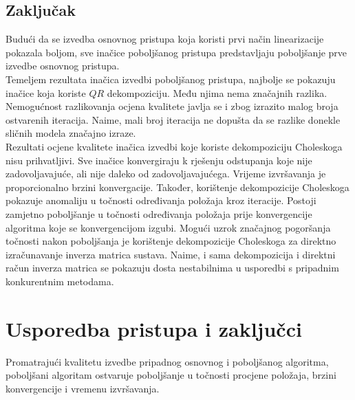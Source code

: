 \documentclass[a4paper,twoside,12pt]{memoir} %
\begin{document}
\subsection{Zaključak}
Budući da se izvedba osnovnog pristupa koja koristi prvi način linearizacije pokazala boljom, 
sve inačice poboljšanog pristupa predstavljaju poboljšanje prve izvedbe osnovnog pristupa.\\
Temeljem rezultata inačica izvedbi poboljšanog pristupa, najbolje se pokazuju inačice koja koriste $QR$ dekompoziciju.
Među njima nema značajnih razlika. Nemogućnost razlikovanja ocjena kvalitete javlja se i zbog izrazito malog broja ostvarenih iteracija.
Naime, mali broj iteracija ne dopušta da se razlike donekle sličnih modela značajno izraze.\\
Rezultati ocjene kvalitete inačica izvedbi koje koriste dekompoziciju Choleskoga nisu prihvatljivi.
Sve inačice konvergiraju k rješenju odstupanja koje nije zadovoljavajuće, ali nije daleko od zadovoljavajućega. Vrijeme izvršavanja je proporcionalno brzini konvergacije.
Također, korištenje dekompozicije Choleskoga pokazuje anomaliju u točnosti određivanja položaja 
kroz iteracije. Postoji zamjetno poboljšanje u točnosti određivanja položaja prije konvergencije algoritma koje se konvergencijom izgubi.
Mogući uzrok značajnog pogoršanja točnosti nakon poboljšanja je korištenje dekompozicije Choleskoga za direktno izračunavanje inverza matrica sustava. Naime, i sama dekompozicija i direktni račun inverza matrica se pokazuju dosta nestabilnima u usporedbi s pripadnim konkurentnim metodama.

\section{Usporedba pristupa i zaključci}
Promatrajući kvalitetu izvedbe pripadnog osnovnog i poboljšanog algoritma, poboljšani algoritam ostvaruje poboljšanje u točnosti procjene položaja, brzini konvergencije i vremenu izvršavanja.
\end{document}
